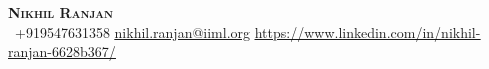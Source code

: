 \begin{center}
    \textbf{\huge \scshape Nikhil Ranjan} \\ \vspace{-2pt}
     \ \small +919547631358 \quad
    \href{mailto:nikhil.ranjan@iiml.org}{ \underline{nikhil.ranjan@iiml.org}} \quad
    \href{https://www.linkedin.com/in/nikhil-ranjan-6628b367/}{ \underline{https://www.linkedin.com/in/nikhil-ranjan-6628b367/}} 
\end{center}
\vspace{-22pt}